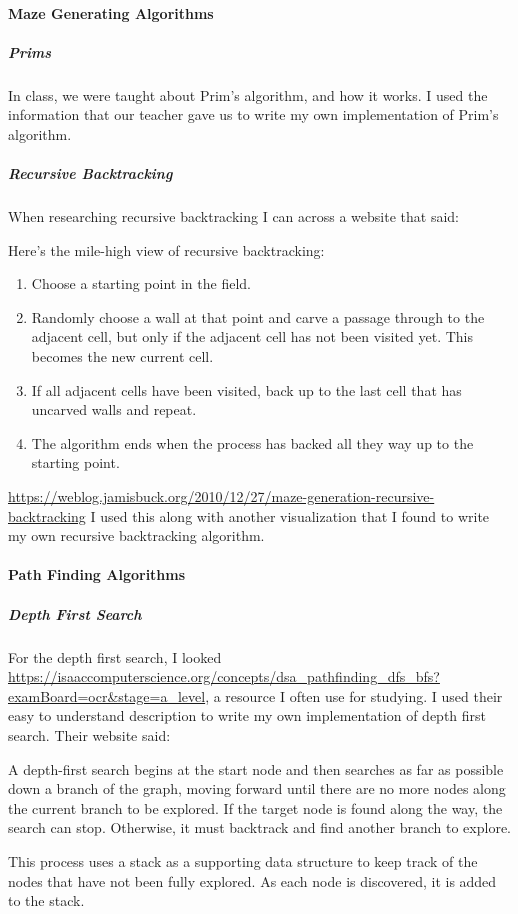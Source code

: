 \documentclass{article}
\begin{document}
\paragraph{Maze Generating Algorithms}
\subparagraph*{Prims}
In class, we were taught about Prim's algorithm, and how it works. I used the information that our teacher gave us to write my own implementation of Prim's algorithm.
\subparagraph*{Recursive Backtracking}
When researching recursive backtracking I can across a website that said:
\begin{quoting}
    Here's the mile-high view of recursive backtracking:
    \begin{enumerate}
        \item Choose a starting point in the field.
        \item Randomly choose a wall at that point and carve a passage through to the adjacent cell, but only if the adjacent cell has not been visited yet. This becomes the new current cell.
        \item If all adjacent cells have been visited, back up to the last cell that has uncarved walls and repeat.
        \item The algorithm ends when the process has backed all they way up to the starting point. 
    \end{enumerate}
\end{quoting}
\url{https://weblog.jamisbuck.org/2010/12/27/maze-generation-recursive-backtracking}
I used this along with another visualization that I found to write my own recursive backtracking algorithm.

\paragraph{Path Finding Algorithms}
\subparagraph*{Depth First Search}
For the depth first search, I looked \url{https://isaaccomputerscience.org/concepts/dsa_pathfinding_dfs_bfs?examBoard=ocr&stage=a_level}, a resource I often use for studying. I used their easy to understand description to write my own implementation of depth first search. Their website said:
\begin{quoting}
    A depth-first search begins at the start node and then searches as far as possible down a branch of the graph, moving forward until there are no more nodes along the current branch to be explored. If the target node is found along the way, the search can stop. Otherwise, it must backtrack and find another branch to explore.

    This process uses a stack as a supporting data structure to keep track of the nodes that have not been fully explored. As each node is discovered, it is added to the stack.
\end{quoting}
\end{document}

